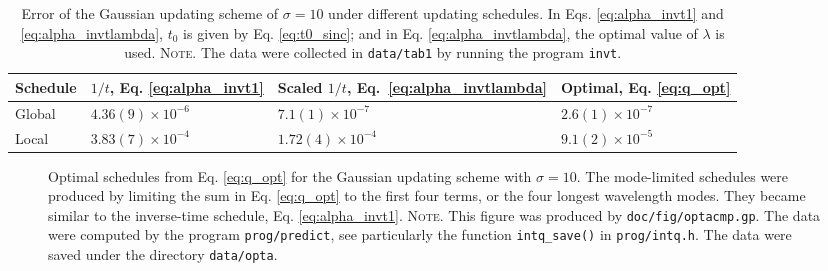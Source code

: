 \documentclass[preprint, floatfix]{revtex4-1}
\newcommand{\note}[1]{{\color{DarkGreen}\footnotesize \textsc{Note.} #1}}
\begin{document}
\begin{table}[h]\footnotesize
  \caption{\label{tab:error_Gaussian}
    Error of the Gaussian updating scheme of $\sigma = 10$
    under different updating schedules.
    In Eqs. \eqref{eq:alpha_invt1} and \eqref{eq:alpha_invtlambda},
    $t_0$ is given by Eq. \eqref{eq:t0_sinc};
    and in Eq. \eqref{eq:alpha_invtlambda},
    the optimal value of $\lambda$ is used.
    \note{\newline
      The data were collected in
      \texttt{data/tab1} by running
      the program \texttt{invt}.
    }%
  }
  \setlength{\tabcolsep}{2pt}
  \renewcommand\arraystretch{1.2}
  \begin{tabular} { l | p{2.2cm} p{2.4cm} p{2.0cm} }
    \hline
      Schedule
    &
      $1/t$, \newline
      Eq. \eqref{eq:alpha_invt1}
    &
      Scaled $1/t$, \newline
      Eq.~\eqref{eq:alpha_invtlambda}
    &
      Optimal, \newline
      Eq. \eqref{eq:q_opt}
    \\
    \hline
    Global
    &
    $4.36(9) \times 10^{-6}$
    &
    $7.1(1) \times 10^{-7}$
    &
    $2.6(1) \times 10^{-7}$
    \\
    \hline
    Local
    &
    $3.83(7) \times 10^{-4}$
    &
    $1.72(4) \times 10^{-4}$
    &
    $9.1(2) \times 10^{-5}$
    \\
    \hline
  \end{tabular}
\end{table}


\begin{figure}[h]
\begin{center}
  \caption{
    \label{fig:optacmp}
    Optimal schedules from Eq. \eqref{eq:q_opt}
    for the Gaussian updating scheme
    with $\sigma = 10$.
    The mode-limited schedules were produced by
    limiting the sum in Eq. \eqref{eq:q_opt}
    to the first four terms,
    or the four longest wavelength modes.
    They became similar to the inverse-time schedule,
    Eq. \eqref{eq:alpha_invt1}.
    \note{This figure was produced by \texttt{doc/fig/optacmp.gp}.
      The data were computed by the program \texttt{prog/predict},
      see particularly the function \texttt{intq\_save()}
      in \texttt{prog/intq.h}.
      The data were saved under the directory \texttt{data/opta}.
    }%
  }
\end{center}
\end{figure}
\end{document}
